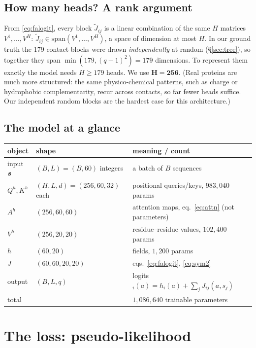 \subsection{How many heads? A rank argument}\label{sec:rank}
From \eqref{eq:falogit}, every block $\tilde J_{ij}$ is a linear combination of the same $H$ matrices
$V^1,\dots,V^H$: $\tilde J_{ij}\in\mathrm{span}(V^1,\dots,V^H)$, a space of dimension at most $H$.
In our ground truth the 179 contact blocks were drawn \emph{independently} at random
(\S\ref{sec:tree}), so together they span $\min(179,(q-1)^2)=179$ dimensions. To represent them exactly the
model needs $H\ge179$ heads. We use $\bm{H=256}$. (Real proteins are much more structured: the same
physico-chemical patterns, such as charge or hydrophobic complementarity, recur across contacts, so
far fewer heads suffice. Our independent random blocks are the hardest case for this architecture.)

\subsection{The model at a glance}
\begin{center}\small
\begin{tabular}{lll}
\toprule
object & shape & meaning / count\\
\midrule
input $\bm{s}$ & $(B,L)=(B,60)$ integers & a batch of $B$ sequences\\
$Q^h,K^h$ & $(H,L,d)=(256,60,32)$ each & positional queries/keys, $983{,}040$ params\\
$A^h$ & $(256,60,60)$ & attention maps, eq.~\eqref{eq:attn} (not parameters)\\
$V^h$ & $(256,20,20)$ & residue--residue values, $102{,}400$ params\\
$h$ & $(60,20)$ & fields, $1{,}200$ params\\
$J$ & $(60,60,20,20)$ & eqs.~\eqref{eq:falogit}, \eqref{eq:sym2}\\
output & $(B,L,q)$ & logits$_i(a)=h_i(a)+\sum_jJ_{ij}(a,s_j)$\\
\midrule
total & & $1{,}086{,}640$ trainable parameters\\
\bottomrule
\end{tabular}
\end{center}

\section{The loss: pseudo-likelihood}\label{sec:plm}
